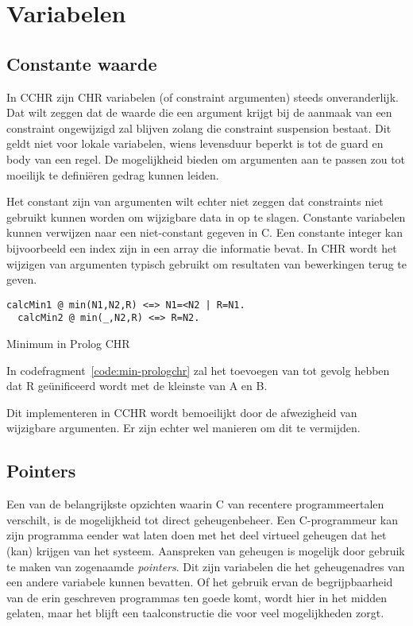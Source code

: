 \section{Variabelen} \label{sec:taal-var}

\subsection{Constante waarde}

In CCHR zijn CHR variabelen (of constraint argumenten) steeds onveranderlijk. Dat wilt zeggen dat de waarde die een argument krijgt bij de aanmaak van een constraint ongewijzigd zal blijven zolang die constraint suspension bestaat. Dit geldt niet voor lokale variabelen, wiens levensduur beperkt is tot de guard en body van een regel. De mogelijkheid bieden om argumenten aan te passen zou tot moeilijk te defini\"eren gedrag kunnen leiden.

Het constant zijn van argumenten wilt echter niet zeggen dat constraints niet gebruikt kunnen worden om wijzigbare data in op te slagen. Constante variabelen kunnen verwijzen naar een niet-constant gegeven in C. Een constante integer kan bijvoorbeeld een index zijn in een array die informatie bevat. In CHR wordt het wijzigen van argumenten typisch gebruikt om resultaten van bewerkingen terug te geven.
\begin{exCode}
\begin{Verbatim}[frame=single]
  calcMin1 @ min(N1,N2,R) <=> N1=<N2 | R=N1.
  calcMin2 @ min(_,N2,R) <=> R=N2.
\end{Verbatim}
\caption{Minimum in Prolog CHR}
\label{code:min-prologchr}
\end{exCode}
In codefragment~\ref{code:min-prologchr} zal het toevoegen van  tot gevolg hebben dat R ge\"unificeerd wordt met de kleinste van A en B.

Dit implementeren in CCHR wordt bemoeilijkt door de afwezigheid van wijzigbare argumenten. Er zijn echter wel manieren om dit te vermijden.

\subsection{Pointers}

Een van de belangrijkste opzichten waarin C van recentere programmeertalen verschilt, is de mogelijkheid tot direct geheugenbeheer. Een C-programmeur kan zijn programma eender wat laten doen met het deel virtueel geheugen dat het (kan) krijgen van het systeem. Aanspreken van geheugen is mogelijk door gebruik te maken van zogenaamde {\em pointers}. Dit zijn variabelen die het geheugenadres van een andere variabele kunnen bevatten. Of het gebruik ervan de begrijpbaarheid van de erin geschreven programmas ten goede komt, wordt hier in het midden gelaten, maar het blijft een taalconstructie die voor veel mogelijkheden zorgt.

